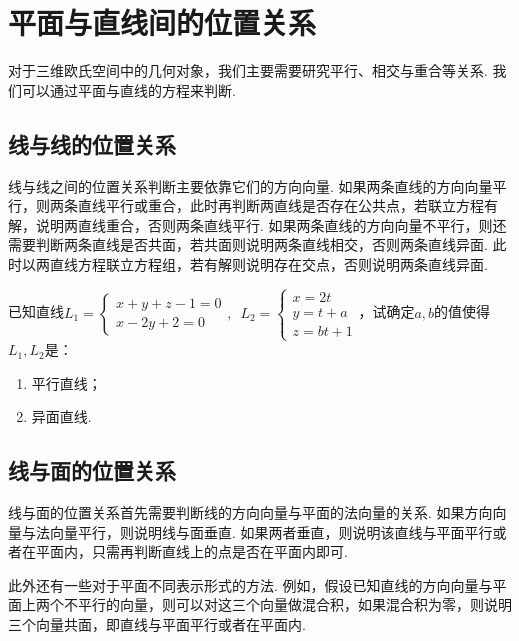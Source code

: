 \section{平面与直线间的位置关系}

对于三维欧氏空间中的几何对象，我们主要需要研究平行、相交与重合等关系. 我们可以通过平面与直线的方程来判断.

\subsection{线与线的位置关系}

线与线之间的位置关系判断主要依靠它们的方向向量. 如果两条直线的方向向量平行，则两条直线平行或重合，此时再判断两直线是否存在公共点，若联立方程有解，说明两直线重合，否则两条直线平行. 如果两条直线的方向向量不平行，则还需要判断两条直线是否共面，若共面则说明两条直线相交，否则两条直线异面. 此时以两直线方程联立方程组，若有解则说明存在交点，否则说明两条直线异面.

\begin{example}{}{}
    已知直线$L_1=\begin{cases}
            x+y+z-1=0 \\
            x-2y+2=0
        \end{cases},\enspace L_2=\begin{cases}
            x=2t  \\
            y=t+a \\
            z=bt+1
        \end{cases}$，试确定$a,b$的值使得$L_1,L_2$是：
    \begin{enumerate}
        \item 平行直线；

        \item 异面直线.
    \end{enumerate}
\end{example}

\subsection{线与面的位置关系}

线与面的位置关系首先需要判断线的方向向量与平面的法向量的关系. 如果方向向量与法向量平行，则说明线与面垂直. 如果两者垂直，则说明该直线与平面平行或者在平面内，只需再判断直线上的点是否在平面内即可.

此外还有一些对于平面不同表示形式的方法. 例如，假设已知直线的方向向量与平面上两个不平行的向量，则可以对这三个向量做混合积，如果混合积为零，则说明三个向量共面，即直线与平面平行或者在平面内.

